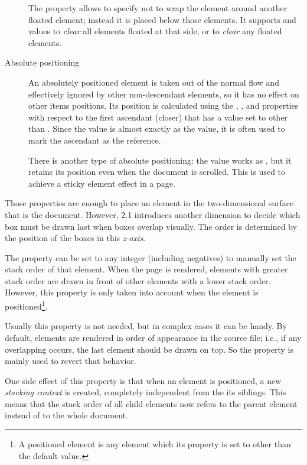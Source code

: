 \begin{description}
  The  property allows to specify not to wrap the element around another floated element; instead it is placed below those elements.
  It supports  and  values to \emph{clear} all elements floated at that side, or  to \emph{clear} any floated elements.
  \item[Absolute positioning] An absolutely positioned element is taken out of the normal flow and effectively ignored by other non-descendant elements, so it has no effect on other items positions.
  Its position is calculated using the , ,  and  properties with respect to the first ascendant (closer) that has a  value set to other than .
  Since the  value is almost exactly as the  value, it is often used to mark the ascendant as the reference.
  
  There is another type of absolute positioning: the  value works as , but it retains its position even when the document is scrolled.
  This is used to achieve a sticky element effect in a page.
\end{description}

Those properties are enough to place an element in the two-dimensional surface that is the document.
However,  2.1 introduces another dimension to decide which box must be drawn last when boxes overlap visually.
The order is determined by the position of the boxes in this \emph{z-axis}.

The  property can be set to any integer (including negatives) to manually set the stack order of that element.
When the page is rendered, elements with greater stack order are drawn in front of other elements with a lower stack order.
However, this  property is only taken into account when the element is positioned\footnote{A positioned element is any element which its  property is set to other than the default  value.}.

Usually this property is not needed, but in complex cases it can be handy.
By default, elements are rendered in order of appearance in the  source file; i.e., if any overlapping occurs, the last element should be drawn on top.
So the  property is mainly used to revert that behavior.

One side effect of this property is that when an element is positioned, a new \emph{stacking context} is created, completely independent from the its siblings.
This means that the stack order of all child elements now refers to the parent element instead of to the whole document.

